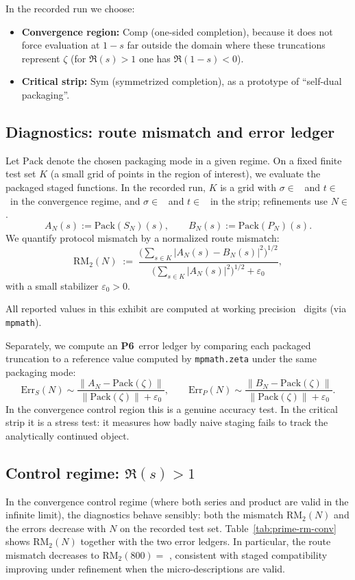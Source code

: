 \documentclass[apajournal,article,submit,moreauthors,pdftex]{Definitions/mdpi}
\newcommand{\Psix}{\textbf{P6}}
\begin{document}
In the recorded run we choose:
\begin{itemize}
  \item \textbf{Convergence region:} $\mathrm{Comp}$ (one-sided completion), because it does not force evaluation at $1-s$ far outside the domain where these truncations represent $\zeta$ (for $\Re(s)>1$ one has $\Re(1-s)<0$).
  \item \textbf{Critical strip:} $\mathrm{Sym}$ (symmetrized completion), as a prototype of ``self-dual packaging''.
\end{itemize}

\subsection{Diagnostics: route mismatch and error ledger}
Let $\mathrm{Pack}$ denote the chosen packaging mode in a given regime.
On a fixed finite test set $K$ (a small grid of points in the region of interest), we evaluate the packaged staged functions.
In the recorded run, $K$ is a grid with $\sigma\in$ \PrimeSigmaConvList\ and $t\in$ \PrimeTList\ in the convergence regime, and $\sigma\in$ \PrimeSigmaStripList\ and $t\in$ \PrimeTList\ in the strip; refinements use $N\in$ \PrimeNList.
\[
A_N(s):=\mathrm{Pack}(S_N)(s),
\qquad
B_N(s):=\mathrm{Pack}(P_N)(s).
\]
We quantify protocol mismatch by a normalized route mismatch:
\[
\mathrm{RM}_2(N)
\;:=\;
\frac{\bigl(\sum_{s\in K}|A_N(s)-B_N(s)|^2\bigr)^{1/2}}
     {\bigl(\sum_{s\in K}|A_N(s)|^2\bigr)^{1/2}+\varepsilon_0},
\]
with a small stabilizer $\varepsilon_0>0$.

All reported values in this exhibit are computed at working precision \PrimeDPS\ digits (via \texttt{mpmath}).

Separately, we compute an \Psix\ error ledger by comparing each packaged truncation to a reference value computed by \texttt{mpmath.zeta} under the same packaging mode:
\[
\mathrm{Err}_S(N) \sim \frac{\|A_N-\mathrm{Pack}(\zeta)\|}{\|\mathrm{Pack}(\zeta)\|+\varepsilon_0},
\qquad
\mathrm{Err}_P(N) \sim \frac{\|B_N-\mathrm{Pack}(\zeta)\|}{\|\mathrm{Pack}(\zeta)\|+\varepsilon_0}.
\]
In the convergence control region this is a genuine accuracy test.
In the critical strip it is a stress test: it measures how badly naive staging fails to track the analytically continued object.

\subsection{Control regime: \texorpdfstring{$\Re(s)>1$}{Re(s)>1}}
In the convergence control regime (where both series and product are valid in the infinite limit), the diagnostics behave sensibly:
both the mismatch $\mathrm{RM}_2(N)$ and the errors decrease with $N$ on the recorded test set.
Table~\ref{tab:prime-rm-conv} shows $\mathrm{RM}_2(N)$ together with the two error ledgers.
In particular, the route mismatch decreases to $\mathrm{RM}_2(800)=$ \PrimeRMConvAtEightHundred,
consistent with staged compatibility improving under refinement when the micro-descriptions are valid.
\end{document}
